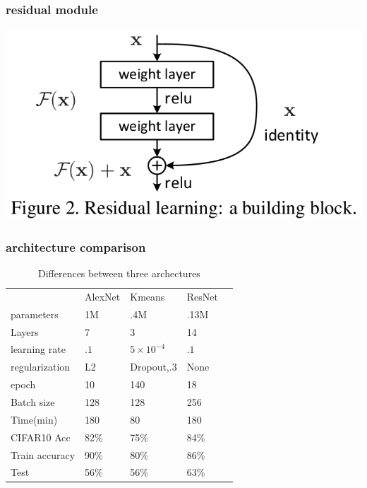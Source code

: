 \documentclass{beamer}
\begin{document}
\begin{frame}
\frametitle{residual module}
\includegraphics[width=.8\textwidth]{resnet.png}
\end{frame}

\begin{frame}
\frametitle{architecture comparison}
  \begin{table}[!hbt]
  \centering
  \caption{Differences between three archectures}
  \begin{tabular}{lllll}
  & AlexNet & Kmeans & ResNet & \\
  parameters    & 1M   & .4M & .13M & \\
  Layers      & 7 & 3 & 14 \\
  learning rate & $.1$   & $5\times10^{-4}$ & $.1$ &  \\  
  regularization & L2  & Dropout,.3       & None &  \\
  epoch & 10  & 140       & 18 &  \\    		
  Batch size & 128  & 128       & 256 &  \\    		
  Time(min)  & 180  & 80       & 180 &\\
  CIFAR10 Acc & 82\% & 75\% & 84\% \\
  Train accuracy  & 90\%  & 80\%       & 86\% & \\
  Test  & 56\%  & 56\%       & 63\% &     		
  \end{tabular}
  \end{table}

\end{frame}
\end{document}
